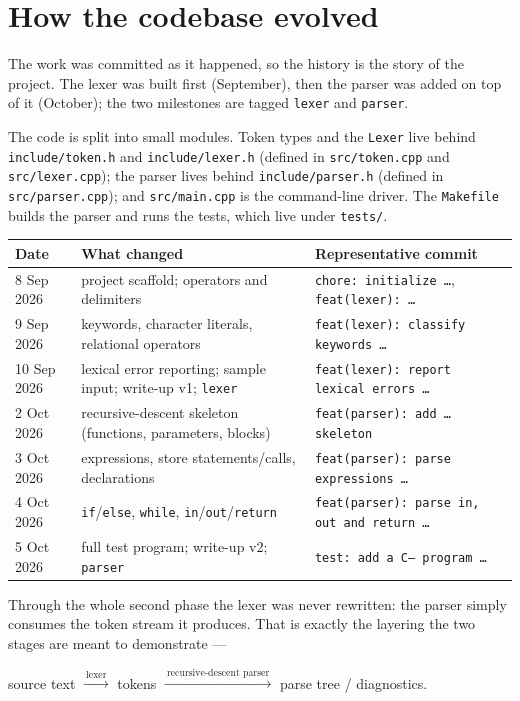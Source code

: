 \documentclass[11pt]{article}
\begin{document}
\section{How the codebase evolved}
The work was committed as it happened, so the history is the story of the
project. The lexer was built first (September), then the parser was added on
top of it (October); the two milestones are tagged \texttt{lexer} and
\texttt{parser}.

The code is split into small modules. Token types and the \texttt{Lexer}
live behind \texttt{include/token.h} and \texttt{include/lexer.h} (defined in
\texttt{src/token.cpp} and \texttt{src/lexer.cpp}); the parser lives behind
\texttt{include/parser.h} (defined in \texttt{src/parser.cpp}); and
\texttt{src/main.cpp} is the command-line driver. The \texttt{Makefile}
builds the parser and runs the tests, which live under \texttt{tests/}.

\begin{center}
\begin{tabular}{@{}p{2.3cm}p{6.2cm}p{5.0cm}@{}}
\toprule
\textbf{Date} & \textbf{What changed} & \textbf{Representative commit}\\
\midrule
8 Sep 2026 & project scaffold; operators and delimiters & \texttt{chore: initialize \ldots}, \texttt{feat(lexer): \ldots}\\
9 Sep 2026 & keywords, character literals, relational operators & \texttt{feat(lexer): classify keywords \ldots}\\
10 Sep 2026 & lexical error reporting; sample input; write-up v1; \texttt{lexer} & \texttt{feat(lexer): report lexical errors \ldots}\\
2 Oct 2026 & recursive-descent skeleton (functions, parameters, blocks) & \texttt{feat(parser): add \ldots skeleton}\\
3 Oct 2026 & expressions, store statements/calls, declarations & \texttt{feat(parser): parse expressions \ldots}\\
4 Oct 2026 & \texttt{if}/\texttt{else}, \texttt{while}, \texttt{in}/\texttt{out}/\texttt{return} & \texttt{feat(parser): parse in, out and return \ldots}\\
5 Oct 2026 & full test program; write-up v2; \texttt{parser} & \texttt{test: add a C-- program \ldots}\\
\bottomrule
\end{tabular}
\end{center}

\noindent
Through the whole second phase the lexer was never rewritten: the parser
simply consumes the token stream it produces. That is exactly the layering
the two stages are meant to demonstrate ---

\begin{center}
source text $\xrightarrow{\ \text{lexer}\ }$ tokens
$\xrightarrow{\ \text{recursive-descent parser}\ }$ parse tree / diagnostics.
\end{center}
\end{document}
